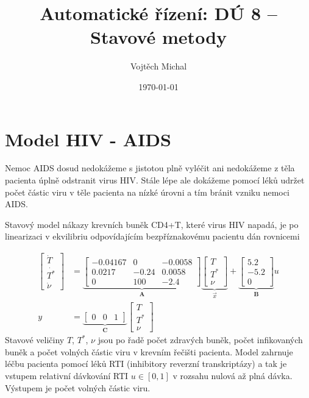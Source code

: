 \documentclass[twoside]{article}
\title{Automatické řízení: DÚ 8 -- Stavové metody}
\author{Vojtěch Michal}
\date{\today}
\begin{document}
\maketitle

\section{Model HIV - AIDS}
Nemoc AIDS dosud nedokážeme s jistotou plně vyléčit ani nedokážeme z těla pacienta úplně odstranit virus
HIV. Stále lépe ale dokážeme pomocí léků udržet počet částic viru v těle pacienta na nízké úrovni a tím
bránit vzniku nemoci AIDS.

Stavový model nákazy krevních buněk CD4+T, které virus HIV napadá, je po linearizaci v ekvilibriu
odpovídajícím bezpříznakovému pacientu dán rovnicemi

\begin{equation}
	\begin{split}
		\begin{bmatrix}
			\dot{T} \\
			\dot{T^{*}} \\
			\dot{\nu}
		\end{bmatrix} &= \underbrace{\begin{bmatrix}
			-0.04167 & 0 & -0.0058 \\
			0.0217 & -0.24 & 0.0058 \\
			0 & 100 & -2.4
		\end{bmatrix}}_{\mathbf{A}} \underbrace{\begin{bmatrix}
		T \\
		T^{*} \\
		\nu
	\end{bmatrix}}_{ \vec{x}} + \underbrace{\begin{bmatrix}
		5.2 \\
		-5.2 \\
		0
	\end{bmatrix}}_{\mathbf{B}} u \\
	y &= \underbrace{\begin{bmatrix}
		0 & 0 & 1
	\end{bmatrix}}_{\mathbf{C}} \begin{bmatrix}
		T \\
		T^{*} \\
		\nu
	\end{bmatrix}
\end{split}
\label{eq:zadani}
\end{equation}
Stavové veličiny $T$, $T^{*}$, $\nu$ jsou po řadě počet zdravých buněk, počet infikovaných buněk a počet volných
částic viru v krevním řečišti pacienta. Model zahrnuje léčbu pacienta pomocí léků RTI (inhibitory reverzní
transkriptázy) a tak je vstupem relativní dávkování RTI  $u \in [0,1]$ v rozsahu nulová až plná dávka. Výstupem
je počet volných částic viru.
\end{document}

